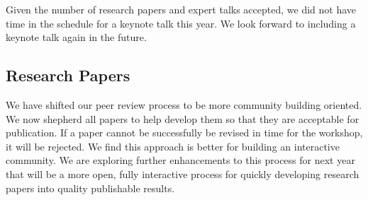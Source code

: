 \documentclass{llncs}
\begin{document}
Given the number of research papers and expert talks accepted, we did not have time in the schedule for a keynote talk this year. We look forward to including a keynote talk again in the future.


\subsection{Research Papers}

We have shifted our peer review process to be more community building oriented. We now shepherd all papers to help develop them so that they are acceptable for publication. If a paper cannot be successfully be revised in time for the workshop, it will be rejected. We find this approach is better for building an interactive community. We are exploring further enhancements to this process for next year that will be a more open, fully interactive process for quickly developing research papers into quality publishable results.
\end{document}
